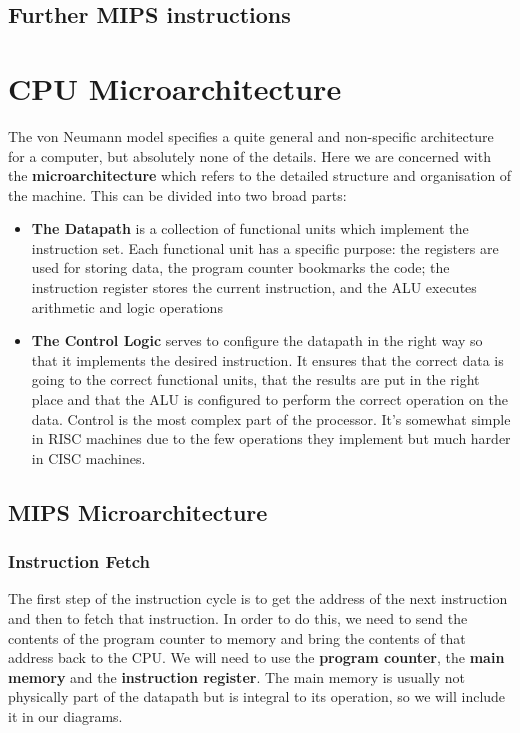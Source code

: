 \documentclass{article}
\begin{document}
	\subsection{Further MIPS instructions}
		
	
	\section{CPU Microarchitecture}
	The von Neumann model specifies a quite general and non-specific architecture for a computer, but absolutely none of the details. Here we are concerned with the \textbf{microarchitecture} which refers to the detailed structure and organisation of the machine. This can be divided into two broad parts:
	\begin{itemize}
		\item \textbf{The Datapath} is a collection of functional units which implement the instruction set. Each functional unit has a specific purpose: the registers are used for storing data, the program counter bookmarks the code; the instruction register stores the current instruction, and the ALU executes arithmetic and logic operations
		
		\item \textbf{The Control Logic} serves to configure the datapath in the right way so that it implements the desired instruction. It ensures that the correct data is going to the correct functional units, that the results are put in the right place and that the ALU is configured to perform the correct operation on the data. Control is the most complex part of the processor. It's somewhat simple in RISC machines due to the few operations they implement but much harder in CISC machines.
	\end{itemize}
	
	\subsection{MIPS Microarchitecture}
	\subsubsection{Instruction Fetch}
	The first step of the instruction cycle is to get the address of the next instruction and then to fetch that instruction. In order to do this, we need to send the contents of the program counter to memory and bring the contents of that address back to the CPU. We will need to use the \textbf{program counter}, the \textbf{main memory} and the \textbf{instruction register}. The main memory is usually not physically part of the datapath but is integral to its operation, so we will include it in our diagrams.
	
\end{document}
